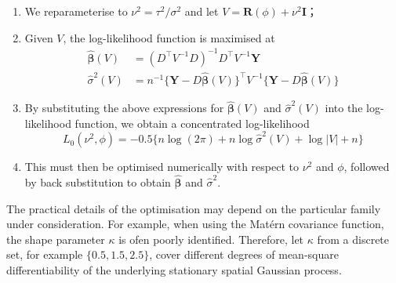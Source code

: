 \documentclass[12pt,a4paper,UTF8,twoside]{book}
\providecommand{\tightlist}{%
  \setlength{\itemsep}{0pt}\setlength{\parskip}{0pt}}
\begin{document}
\begin{enumerate}
\def\labelenumi{\arabic{enumi}.}
\tightlist
\item
  We reparameterise to \(\nu^2 = \tau^2/\sigma^2\) and let
  \(V = \mathbf{R}(\phi) + \nu^2 \mathbf{I}\)；
\item
  Given \(V\), the log-likelihood function is maximised at
  \begin{equation}
  \begin{aligned}
     \hat{\boldsymbol{\beta}}(V) & =  (D^{\top} V^{-1} D)^{-1} D^{\top} V^{-1}\mathbf{Y} \\
     \hat{\sigma}^2(V)           & =  n^{-1} \{\mathbf{Y} - D\hat{\boldsymbol{\beta}}(V)\}^{\top} V^{-1} \{\mathbf{Y} - D\hat{\boldsymbol{\beta}}(V)\}
  \end{aligned} \label{eq:beta-sigma-en}
  \end{equation}
\item
  By substituting the above expressions for
  \(\hat{\boldsymbol{\beta}}(V)\) and \(\hat{\sigma}^2(V)\) into the
  log-likelihood function, we obtain a concentrated log-likelihood
  \begin{equation}
     L_{0}(\nu^2,\phi) = - 0.5\{ n\log(2\pi) + n\log \hat{\sigma}^2(V) + \log |V| + n \} \label{eq:reduced-gauss-log-lik-en}
  \end{equation}
\item
  This must then be optimised numerically with respect to \(\nu^2\) and
  \(\phi\), followed by back substitution to obtain
  \(\hat{\boldsymbol{\beta}}\) and \(\hat{\sigma}^2\).
\end{enumerate}

The practical details of the optimisation may depend on the particular
family under consideration. For example, when using the Matérn
covariance function, the shape parameter \(\kappa\) is ofen poorly
identified. Therefore, let \(\kappa\) from a discrete set, for example
\(\{0.5,1.5,2.5\}\), cover different degrees of mean-square
differentiability of the underlying stationary spatial Gaussian process.
\end{document}
